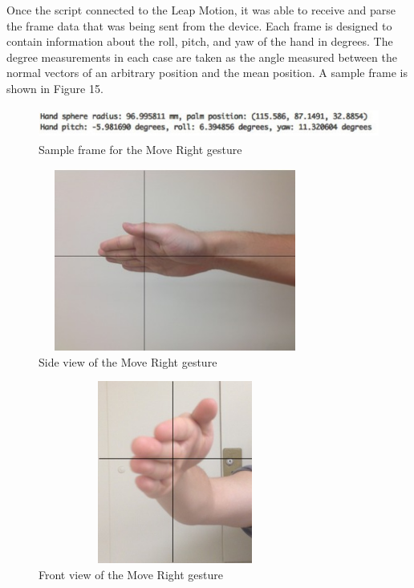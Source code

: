 \documentclass[letterpaper,english, 12pt]{article}
\begin{document}
Once the script connected to the Leap Motion, it was able to receive and parse the frame data that was being sent from the device. Each frame is designed to contain information about the roll, pitch, and yaw of the hand in degrees. The degree measurements in each case are taken as the angle measured between the normal vectors of an arbitrary position and the mean position. A sample frame is shown in Figure 15.

\begin{figure}[H]
	\centering
	\includegraphics[height=1cm,width=130mm]{pics/frameData.jpg}
	\caption{Sample frame for the Move Right gesture}
\end{figure}

\begin{figure}[H]
	\centering
	\includegraphics[height=6cm,width=90mm]{pics/correspondingHand1.jpg}
	\caption{Side view of the Move Right gesture}
\end{figure}

\begin{figure}[H]
	\centering
	\includegraphics[height=6cm,width=90mm]{pics/correspondingHand2.jpg}
	\caption{Front view of the Move Right gesture}
\end{figure}
\end{document}
